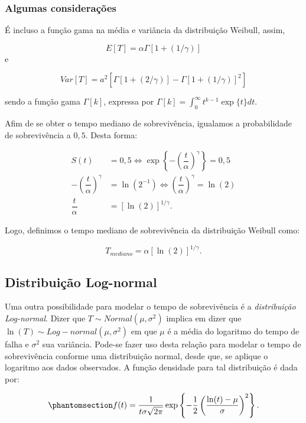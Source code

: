 \documentclass[
  12pt,
  letterpaper,
  DIV=11,
  numbers=noendperiod]{scrreprt}
\begin{document}
\subsubsection{Algumas
considerações}\label{algumas-considerauxe7uxf5es-1}

É incluso a função gama na média e variância da distribuição Weibull,
assim,

\[
E[T] = \alpha \Gamma[1 + (1/\gamma)]
\] e

\[
Var[T] = a^{2} \left[ \Gamma [1 + (2/\gamma)] - \Gamma [1 + (1/\gamma)]^{2} \right]
\]

sendo a função gama \(\Gamma [k]\), expressa por
\(\Gamma [k] = \int_{0}^{\infty} t^{k -1} \exp\{t\} dt\).

Afim de se obter o tempo mediano de sobrevivência, igualamos a
probabilidade de sobrevivência a \(0,5\). Desta forma:

\begin{align*}
    S(t) & = 0,5 \Leftrightarrow \exp \left\{ - \left( \dfrac{t}{\alpha} \right)^{\gamma} \right\} = 0,5 \\
    - \left( \dfrac{t}{\alpha} \right)^{\gamma} & = \ln{(2^{-1})} \Leftrightarrow \left( \dfrac{t}{\alpha} \right)^{\gamma} = \ln{(2)} \\
    \dfrac{t}{\alpha} & = [\ln{(2)}]^{1/\gamma}.
\end{align*}

Logo, definimos o tempo mediano de sobrevivência da distribuição Weibull
como:

\[
T_{mediano} = \alpha [\ln{(2)}]^{1/\gamma}.
\]

\subsection{Distribuição
Log-normal}\label{distribuiuxe7uxe3o-log-normal}

Uma outra possibilidade para modelar o tempo de sobrevivência é a
\emph{distribuição Log-normal}. Dizer que
\(T \sim Normal(\mu, \sigma^{2})\) implica em dizer que
\(\ln(T) \sim Log-normal(\mu, \sigma^{2})\) em que \(\mu\) é a média do
logaritmo do tempo de falha e \(\sigma^{2}\) sua variância. Pode-se
fazer uso desta relação para modelar o tempo de sobrevivência conforme
uma distribuição normal, desde que, se aplique o logaritmo aos dados
observados. A função densidade para tal distribuição é dada por:

\begin{equation}\phantomsection\label{eq-densitLognormal}{
f (t) = \dfrac{1}{t \sigma \sqrt{2 \pi}} \exp \left\{- \dfrac{1}{2} \left(\dfrac{\ln(t) - \mu}{\sigma}\right)^{2} \right\}.
}\end{equation}
\end{document}
